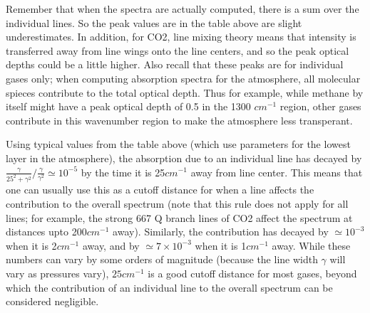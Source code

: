 \documentclass[11pt]{article}
\begin{document}
Remember that when the spectra are actually computed, there is a sum over 
the individual lines. So the peak values are in the table above are slight 
underestimates. In addition, for CO2, line mixing theory means that 
intensity is transferred away from line wings onto the line centers, and 
so the peak optical depths could be a little higher. Also recall that these 
peaks are for individual gases only; when computing absorption spectra for
the atmosphere, all molecular spieces contribute to the total optical depth. 
Thus for example, while methane by itself might have a peak optical depth of 
0.5 in the 1300 $cm^{-1}$ region, other gases contribute in this wavenumber 
region to make the atmosphere less transperant.

Using typical values from the table above (which use parameters for the lowest
layer in the atmosphere), the absorption due to an individual line has 
decayed by 
$ \frac{\gamma}{25^{2}+\gamma^{2}}/\frac{\gamma}{\gamma^{2}}\simeq 10^{-5}$
by the time it is 25$cm^{-1}$ away from line center. This means that one can
usually use this as a cutoff distance for when a line affects the 
contribution to the overall spectrum (note that this rule does not apply for
all lines; for example, the strong 667 Q branch lines of CO2 affect the
spectrum at distances upto 200$cm^{-1}$ away). 
Similarly, the contribution has decayed by $\simeq 10^{-3}$ when it is 
2$cm^{-1}$ away, and by $\simeq 7 \times 10^{-3}$ when it is 1$cm^{-1}$ away. 
While these numbers can vary by some orders of magnitude (because the line
width $\gamma$ will vary as pressures vary), $25 cm^{-1}$ is a good cutoff 
distance for most gases, beyond which the contribution of an individual line
to the overall spectrum can be considered negligible.
\end{document}
